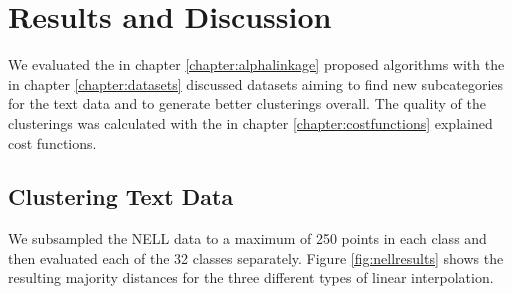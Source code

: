 \chapter{Results and Discussion}
\label{sec:results}


We evaluated the in chapter \ref{chapter:alphalinkage} proposed algorithms with the in chapter \ref{chapter:datasets} discussed datasets aiming to find new subcategories for the text data and to generate better clusterings overall. The quality of the clusterings was calculated with the in chapter \ref{chapter:costfunctions} explained cost functions.

\section{Clustering Text Data}

We subsampled the NELL data to a maximum of 250 points in each class and then evaluated each of the 32 classes separately. Figure \ref{fig:nellresults} shows the resulting majority distances for the three different types of linear interpolation.

